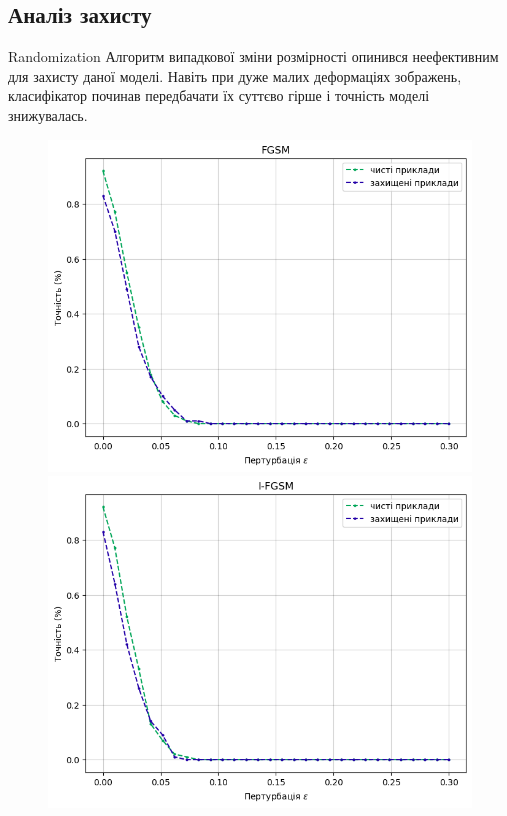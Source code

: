 \documentclass[aspectratio=169]{beamer}
\begin{document}
	\subsection{Аналіз захисту}
	\begin{frame}{Randomization}
	 	Алгоритм випадкової зміни розмірності опинився неефективним для захисту даної 	моделі. Навіть при дуже малих деформаціях зображень, класифікатор починав передбачати їх суттєво гірше і точність моделі знижувалась.

		\begin{figure}[!htb]
			\includegraphics[width=1\textwidth]{../CourseWorkLatex/resources/fgsm_rand_defence.png}
			\endminipage\hfill
			\includegraphics[width=1\textwidth]{../CourseWorkLatex/resources/ifgsm_rand_defence.png}

\end{figure}
\end{frame}
\end{document}
